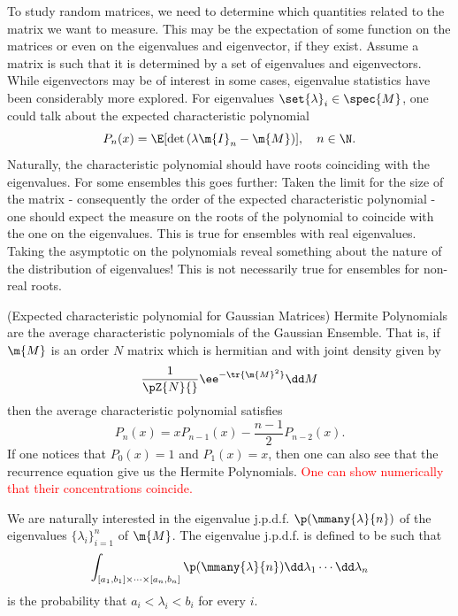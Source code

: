 To study random matrices, we need to determine which quantities related to the matrix we want to measure. This may be the expectation of some function on the matrices or even on the eigenvalues and eigenvector, if they exist. Assume a matrix is such that it is determined by a set of eigenvalues and eigenvectors. While eigenvectors may be of interest in some cases, eigenvalue statistics have been considerably more explored. For eigenvalues $\set{\lambda}_i \in \spec{M}$, one could talk about the expected characteristic polynomial 
\begin{equation}
	P_n(x) = \E[ \det\left(\lambda \m{I}_n - \m{M}\right)], \quad n \in \N.
\end{equation}
Naturally, the characteristic polynomial should have roots coinciding with the eigenvalues. For some ensembles this goes further: Taken the limit for the size of the matrix - consequently the order of the expected characteristic polynomial - one should expect the measure on the roots of the polynomial to coincide with the one on the eigenvalues. This is true for ensembles with real eigenvalues. Taking the asymptotic on the polynomials reveal something about the nature of the distribution of eigenvalues! This is not necessarily true for ensembles for non-real roots.

\begin{exemplo} (Expected characteristic polynomial for Gaussian Matrices)
		Hermite Polynomials are the average characteristic polynomials of the Gaussian Ensemble. That is, if $\m{M}$ is an order $N$ matrix which is hermitian and with joint density given by
	\begin{equation}
		\frac{1}{\pZ{N}{}} \ee^{-\tr{\m{M}^2}} \dd M
	\end{equation}
	then the average characteristic polynomial satisfies
	\begin{equation}
		P_n(x) = x P_{n-1}(x) - \frac{n-1}{2} P_{n-2}(x).
	\end{equation}
	If one notices that $P_0(x) = 1$ and $P_1(x) = x$, then one can also see that the recurrence equation give us the Hermite Polynomials. \textcolor{red}{One can show numerically that their concentrations coincide.}
\end{exemplo}

We are naturally interested in the eigenvalue j.p.d.f. $\p(\mmany{\lambda}{n})$ of the eigenvalues $\{\lambda_i\}_{i=1}^{n}$ of $\m{M}$. The eigenvalue j.p.d.f. is defined to be such that 
\begin{equation}
	\int_{[a_1, b_1] \times \cdots \times [a_n, b_n]} \p(\mmany{\lambda}{n}) \dd \lambda_1 \cdots \dd \lambda_n
\end{equation}
is the probability that $a_i < \lambda_i < b_i$ for every $i$.

